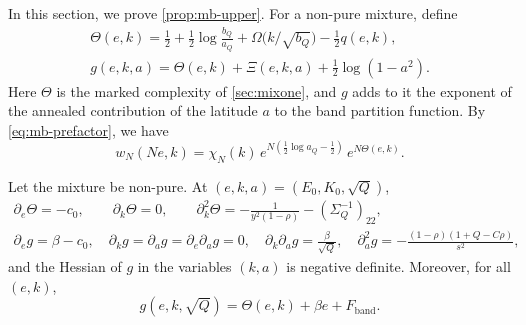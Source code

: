 In this section, we prove \cref{prop:mb-upper}. For a non-pure mixture, define
\begin{equation}\label{eq:mb-Theta}
\begin{gathered}
\Theta(e,k)=\frac12+\frac12\log\frac{b_Q}{a_Q}+\Omega\bigl(k/\sqrt{b_Q}\bigr)-\frac12q(e,k),\\
g(e,k,a)=\Theta(e,k)+\Xi(e,k,a)+\frac12\log(1-a^2).
\end{gathered}
\end{equation}
Here $\Theta$ is the marked complexity of \cref{sec:mixone}, and $g$ adds to it the exponent of the annealed contribution of the latitude $a$ to the band partition function. By \eqref{eq:mb-prefactor}, we have
\begin{equation}\label{eq:mb-wN}
w_N(Ne,k)=\chi_N(k)\,e^{N(\frac12\log a_Q-\frac12)}\,e^{N\Theta(e,k)} .
\end{equation}

\begin{lemma}\label{lem:mb-saddle}
Let the mixture be non-pure. At $(e,k,a)=(E_0,K_0,\sqrt Q)$,
\begin{gather}
\partial_e\Theta=-c_0,\qquad\partial_k\Theta=0,\qquad\partial_k^2\Theta=-\frac1{y^2(1-\rho)}-(\Sigma_Q^{-1})_{22},\label{eq:mb-Theta-derivs}\\
\partial_eg=\beta-c_0,\quad\partial_kg=\partial_ag=\partial_e\partial_ag=0,\quad\partial_k\partial_ag=\frac\beta{\sqrt Q},\quad\partial_a^2g=-\frac{(1-\rho)(1+Q-C\rho)}{s^2},\label{eq:mb-g-derivs}
\end{gather}
and the Hessian of $g$ in the variables $(k,a)$ is negative definite. Moreover, for all $(e,k)$,
\begin{equation}\label{eq:mb-g-exact}
g(e,k,\sqrt Q)=\Theta(e,k)+\beta e+F_{\mathrm{band}} .
\end{equation}
\end{lemma}


